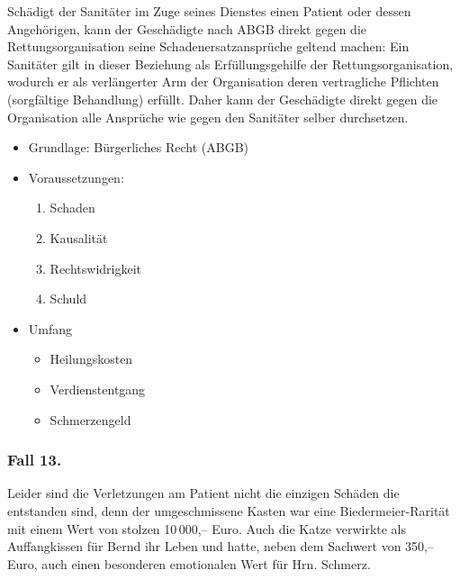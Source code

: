 {Schädigt der Sanitäter im Zuge seines Dienstes einen Patient
oder dessen Angehörigen, kann der Geschädigte nach
 ABGB direkt gegen die Rettungsorganisation
seine Schadenersatzansprüche geltend machen: Ein Sanitäter
gilt in dieser Beziehung als Erfüllungsgehilfe der
Rettungsorganisation, wodurch er als verlängerter Arm der
Organisation deren vertragliche Pflichten (sorgfältige
Behandlung) erfüllt. Daher kann der Geschädigte direkt gegen
die Organisation alle Ansprüche wie gegen den Sanitäter
selber durchsetzen.
}{
\begin{itemize}
  \item Grundlage: Bürgerliches Recht (ABGB)
  \item Voraussetzungen:
  \begin{enumerate}
    \item {Schaden}
    \item {Kausalität}
    \item {Rechtswidrigkeit}
    \item {Schuld}
\end{enumerate}
\item Umfang
\begin{itemize}
	\item Heilungskosten
	\item Verdienstentgang
	\item Schmerzengeld
\end{itemize}
\end{itemize}
}
{}{}{}



\subsubsection{Fall 13. }
\label{topic:jus-langer-dienst-fall-13}


{Leider sind die Verletzungen am Patient nicht die einzigen
Schäden die entstanden sind, denn der umgeschmissene Kasten
war eine Biedermeier-Rarität mit einem Wert von stolzen
10\,000,-- Euro. Auch die Katze verwirkte als Auffangkissen
für Bernd ihr Leben und hatte, neben dem Sachwert von 350,--
Euro, auch einen besonderen emotionalen Wert für
Hrn. Schmerz.}{}{}{}{}



